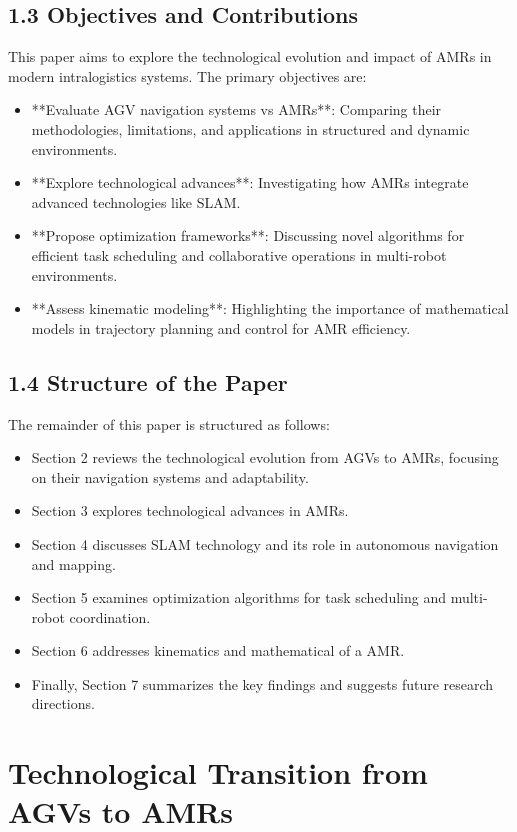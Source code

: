 \documentclass[conference]{IEEEtran}
\begin{document}
\subsection*{\textbf{1.3} Objectives and Contributions}
This paper aims to explore the technological evolution and impact of AMRs in modern intralogistics systems. The primary objectives are:
\begin{itemize}
    \item **Evaluate AGV navigation systems vs AMRs**: Comparing their methodologies, limitations, and applications in structured and dynamic environments.
    \item **Explore technological advances**: Investigating how AMRs integrate advanced technologies like SLAM.
    \item **Propose optimization frameworks**: Discussing novel algorithms for efficient task scheduling and collaborative operations in multi-robot environments.
    \item **Assess kinematic modeling**: Highlighting the importance of mathematical models in trajectory planning and control for AMR efficiency.
\end{itemize}

\subsection*{\textbf{1.4} Structure of the Paper}
The remainder of this paper is structured as follows:
\begin{itemize}
    \item Section 2 reviews the technological evolution from AGVs to AMRs, focusing on their navigation systems and adaptability.
    \item Section 3 explores technological advances in AMRs.
    \item Section 4 discusses SLAM technology and its role in autonomous navigation and mapping.
    \item Section 5 examines optimization algorithms for task scheduling and multi-robot coordination.
    \item Section 6 addresses kinematics and mathematical of a AMR.
    \item Finally, Section 7 summarizes the key findings and suggests future research directions.
\end{itemize}

\section{Technological Transition from AGVs to AMRs}
\end{document}
